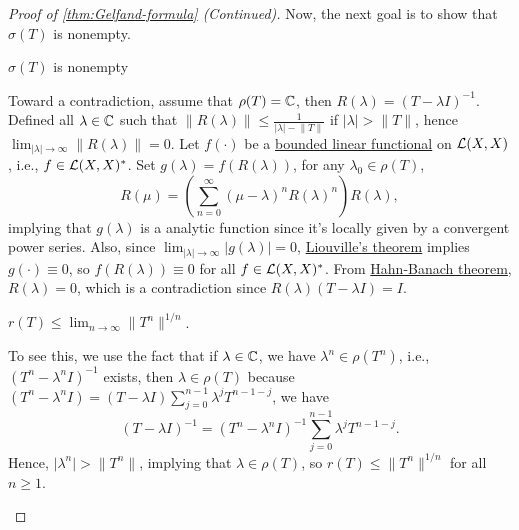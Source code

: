 \begin{proof}[Proof of \autoref{thm:Gelfand-formula} (Continued)]
	Now, the next goal is to show that \(\sigma (T)\) is nonempty.
	\begin{claim}
		\(\sigma (T)\) is nonempty
	\end{claim}
	\begin{explanation}
		Toward a contradiction, assume that \(\rho (T) = \mathbb{\MakeUppercase{c}} \), then \(R(\lambda ) = (T-\lambda I)^{-1} \). Defined all \(\lambda \in \mathbb{\MakeUppercase{c}} \) such that \(\lVert R(\lambda ) \rVert \leq \frac{1}{\vert \lambda  \vert - \lVert T \rVert }\) if \(\vert \lambda  \vert > \lVert T \rVert \), hence \(\lim_{\vert \lambda  \vert \to \infty} \lVert R(\lambda ) \rVert = 0\). Let \(f(\cdot)\) be a \hyperref[def:bounded-linear-functional]{bounded linear functional} on \(\mathcal{\MakeUppercase{l}} (X, X)\), i.e., \(f\in \mathcal{\MakeUppercase{l}} (X, X)^{\ast} \). Set \(g(\lambda ) = f(R(\lambda ))\), for any \(\lambda _0\in \rho (T)\),
		\[
			R(\mu ) = \left( \sum_{n=0}^{\infty} (\mu -\lambda )^n R(\lambda )^n  \right) R(\lambda ),
		\]
		implying that \(g(\lambda )\) is a analytic function since it's locally given by a convergent power series. Also, since \(\lim_{\vert \lambda \vert \to \infty} \vert g(\lambda ) \vert = 0\), \href{https://en.wikipedia.org/wiki/Liouville's_theorem_(complex_analysis)}{Liouville's theorem} implies \(g(\cdot) \equiv 0\), so \(f(R(\lambda ))\equiv 0\) for all \(f\in \mathcal{\MakeUppercase{l}} (X, X)^{\ast} \). From \hyperref[thm:Hahn-Banach]{Hahn-Banach theorem}, \(R(\lambda ) = 0\), which is a contradiction since \(R(\lambda )(T-\lambda I) = I\).
	\end{explanation}

	\begin{claim}
		\(r(T) \leq \lim_{n \to \infty} \lVert T^n \rVert ^{1 / n}\).
	\end{claim}
	\begin{explanation}
		To see this, we use the fact that if \(\lambda \in \mathbb{\MakeUppercase{c}} \), we have \(\lambda ^n \in \rho (T^n)\), i.e., \((T^n - \lambda ^n I)^{-1} \) exists, then \(\lambda \in \rho (T)\) because \((T^n - \lambda ^n I) = (T - \lambda I)\sum_{j=0}^{n-1} \lambda ^j T^{n-1-j}\), we have
		\[
			(T-\lambda I)^{-1} = (T^n - \lambda ^n I)^{-1} \sum_{j=0}^{n-1} \lambda ^j T^{n-1-j}.
		\]
		Hence, \(\vert \lambda ^n \vert > \lVert T^n \rVert \), implying that \(\lambda \in \rho (T)\), so \(r(T) \leq \lVert T^n \rVert ^{1 / n}\) for all \(n\geq 1\).
	\end{explanation}


\end{proof}
